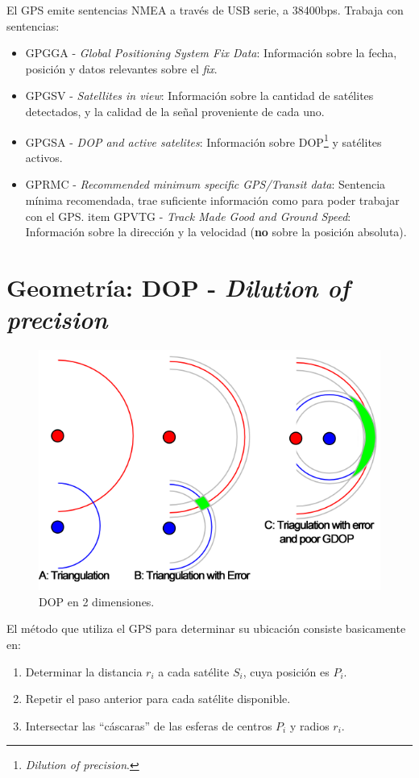 \documentclass[spanish,12pt,a4paper,titlepage]{report}
\begin{document}
El GPS emite sentencias NMEA a través de USB serie, a 38400bps. Trabaja con sentencias:
\begin{itemize}
\item GPGGA - \textit{Global Positioning System Fix Data}: Información sobre la fecha, posición y datos relevantes sobre el \textit{fix}.
\item GPGSV - \textit{Satellites in view}: Información sobre la cantidad de satélites detectados, y la calidad de la señal proveniente de cada uno.
\item GPGSA - \textit{DOP and active satelites}: Información sobre DOP\footnote{\textit{Dilution of precision}.} y satélites activos.
\item GPRMC - \textit{Recommended minimum specific GPS/Transit data}: Sentencia mínima recomendada, trae suficiente información como para poder trabajar con el GPS.
item GPVTG - \textit{Track Made Good and Ground Speed}: Información sobre la dirección y la velocidad (\textbf{no} sobre la posición absoluta).
\end{itemize}

\section{Geometría: DOP - \textit{Dilution of precision}}
\label{sec:dop}

\begin{figure}
\vspace{-30pt}
  \begin{center}
    \includegraphics[width=.5\textwidth]{./img/dop.png}
  \end{center}
\vspace{-20pt}
  \caption{DOP en 2 dimensiones.}
\vspace{-50pt}
\label{fig:dop.png}
\end{figure}

El método que utiliza el GPS para determinar su ubicación consiste basicamente en:
\begin{enumerate}
\item Determinar la distancia $r_i$ a cada satélite $S_i$, cuya posición es $P_i$.
\item Repetir el paso anterior para cada satélite disponible.
\item Intersectar las ``cáscaras'' de las esferas de centros $P_i$ y radios $r_i$.
\end{enumerate}
\end{document}
